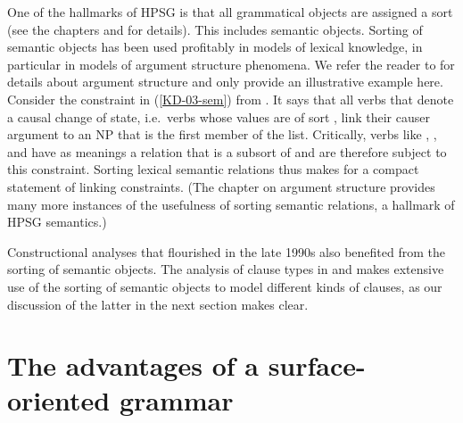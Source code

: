 \documentclass[output=paper
 	        ,biblatex
                ,babelshorthands
                ,newtxmath
                ,draftmode
                ,colorlinks, citecolor=brown
]{langscibook}
\begin{document}
One of the hallmarks of HPSG is that all grammatical objects are assigned a sort (see the chapters  and  for details). This includes semantic objects. Sorting of semantic objects has been used profitably in models of lexical knowledge, in particular in models of argument structure phenomena. We refer the reader to  for details about argument structure and only provide an illustrative example here. Consider the constraint in (\ref{KD-03-sem}) from \citet[231]{KoenigandDavis2003}. It says that all verbs that denote a causal change of state, i.e.\ verbs whose  values are of sort ,
 link their causer argument to an NP that is the first member of the  list. 
\ea\label{KD-03-sem}
\impl{}
\z
Critically, verbs like , , and  have as meanings a relation that is a subsort of  and are therefore subject to this constraint.  Sorting lexical semantic relations thus makes for a compact statement of linking constraints. (The chapter on argument structure provides many more instances of the usefulness of sorting semantic relations, a hallmark of HPSG semantics.)


Constructional analyses that flourished in the late 1990s also benefited from the sorting of semantic objects. The analysis  of clause types in \citet{Sag1997} and \citet{GinzburgandSag2001} makes extensive use of the sorting of semantic objects to model different kinds of clauses, as our discussion of the latter in the next section makes clear.

\section{The advantages of a surface-oriented grammar}
\label{sec:adv}
\end{document}
